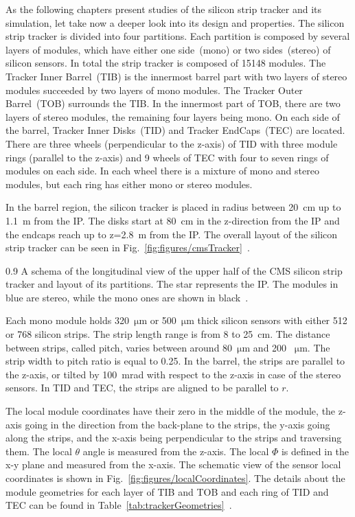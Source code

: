 As the following chapters present studies of the silicon strip tracker and its simulation, let take now a deeper look into its design and properties. The silicon strip tracker is divided into four partitions. Each partition is composed by several layers of modules, which have either one side~(mono) or two sides~(stereo) of silicon sensors. In total the strip tracker is composed of 15148 modules. The Tracker Inner Barrel~(TIB) is the innermost barrel part with two layers of stereo modules succeeded by two layers of mono modules. The Tracker Outer Barrel~(TOB) surrounds the TIB. In the innermost part of TOB, there are two layers of stereo modules, the remaining four layers being mono. On each side of the barrel, Tracker Inner Disks~(TID) and Tracker EndCaps~(TEC) are located. There are three wheels (perpendicular to the z-axis) of TID with three module rings (parallel to the z-axis) and 9 wheels of TEC with four to seven rings of modules on each side. In each wheel there is a mixture of mono and stereo modules, but each ring has either mono or stereo modules. 

In the barrel region, the silicon tracker is placed in radius between 20~cm up to 1.1~m from the IP. The disks start at 80~cm in the z-direction from the IP and the endcaps reach up to z=2.8~m from the IP. The overall layout of the silicon strip tracker can be seen in Fig.~\ref{fig:figures/cmsTracker}~\cite{Chatrchyan:2014fea}.

                 {0.9}       
                 {A schema of the longitudinal view of the upper half of the CMS silicon strip tracker and layout of its partitions. The star represents the IP. The modules in blue are stereo, while the mono ones are shown in black~\cite{Chatrchyan:2014fea}. }

Each mono module holds 320~$\mathrm{\mu m}$ or 500~$\mathrm{\mu m}$ thick silicon sensors with either 512 or 768 silicon strips.  The strip length range is from 8 to 25~cm. The distance between strips, called pitch, varies between around 80~$\mathrm{\mu m}$ and 200 ~$\mathrm{\mu m}$. The strip width to pitch ratio is equal to 0.25. In the barrel, the strips are parallel to the z-axis, or tilted by 100~mrad with respect to the z-axis in case of the stereo sensors. In TID and TEC, the strips are aligned to be parallel to $r$. 

The local module coordinates have their zero in the middle of the module, the z-axis going in the direction from the back-plane to the strips, the y-axis going along the strips, and the x-axis being perpendicular to the strips and traversing them. The local $\theta$ angle is measured from the z-axis. The local $\Phi$ is defined in the x-y plane and measured from the x-axis. The schematic view of the sensor local coordinates is shown in Fig.~\ref{fig:figures/localCoordinates}. The details about the module geometries for each layer of TIB and TOB and each ring of TID and TEC can be found in Table~\ref{tab:trackerGeometries}~\cite{website:hephyPage}.



